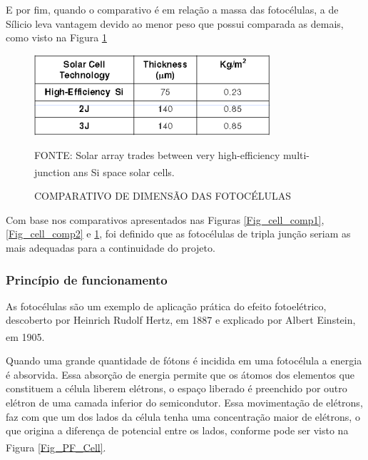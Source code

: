\documentclass[
	12pt,				%
	openright,			%
	oneside,			%
	a4paper,			%
	english,			%
	french,				%
	spanish,			%
	brazil,				%
	oldfontcommands
	]{abntex2}
\begin{document}
	E por fim, quando o comparativo é em relação a massa das fotocélulas, a de Sílicio leva vantagem devido ao menor peso que possui comparada as demais, como visto na Figura \ref{Fig_cell_comp3}
	
	\begin{figure}[th]
		\caption{COMPARATIVO DE DIMENSÃO DAS FOTOCÉLULAS}
		\label{Fig_cell_comp3}
		\centering
		\includegraphics[width=0.6\linewidth]{./figs/cell_comp3}
			
		\begin{small}
			FONTE: Solar array trades between very high-efficiency multi-junction ans Si space solar cells.\textsuperscript{\cite{Fatemi}}
		\end{small}		
	\end{figure}
	
	Com base nos comparativos apresentados nas Figuras \ref{Fig_cell_comp1}, \ref{Fig_cell_comp2} e \ref{Fig_cell_comp3}, foi definido que as fotocélulas de tripla junção seriam as mais adequadas para a continuidade do projeto.
	
\subsubsection[Princípio de funcionamento]{Princípio de funcionamento}

	As fotocélulas são um exemplo de aplicação prática do efeito fotoelétrico, descoberto por Heinrich Rudolf Hertz, em 1887 e explicado por Albert Einstein, em 1905.\textsuperscript{\cite{celula}}
	
	Quando uma grande quantidade de fótons é incidida em uma fotocélula a energia é absorvida. Essa absorção de energia permite que os átomos dos elementos que constituem a célula liberem elétrons, o espaço liberado é preenchido por outro elétron de uma camada inferior do semicondutor. Essa movimentação de elétrons, faz com que um dos lados da célula tenha uma concentração maior de elétrons, o que origina a diferença de potencial entre os lados, conforme pode ser visto na Figura \ref{Fig_PF_Cell}.\textsuperscript{\cite{celula2}}
	
\end{document}
